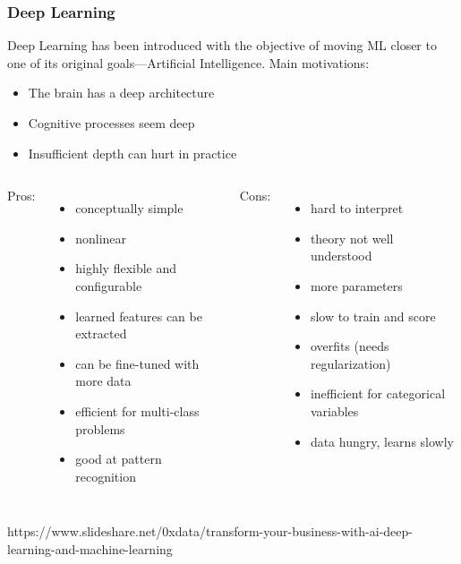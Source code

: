 \begin{frame}
  \MyLogo
  \frametitle{Deep Learning}  

\small

\begin{mdframed}[style=mystyle2]
Deep Learning has been introduced with the objective of moving ML closer to one of its original goals---\alert{Artificial Intelligence}. Main motivations:
%
\begin{itemize}\scriptsize\setlength\itemsep{0.1em}
\item The brain has a deep architecture
\item Cognitive processes seem deep
\item Insufficient depth can hurt in practice
\end{itemize}
\end{mdframed}

\medskip

\begin{columns}

{\color{blue}Pros:}
\begin{itemize}\setlength\itemsep{0.15em}
\item conceptually simple
\item nonlinear 
\item highly flexible and configurable
\item learned features can be extracted
\item can be fine-tuned with more data
\item efficient for multi-class problems
\item good at pattern recognition
\end{itemize}

{\color{red}Cons:}
\begin{itemize}\setlength\itemsep{0.15em}
\item hard to interpret 
\item theory not well understood
\item more parameters
\item slow to train and score
\item overfits (needs regularization)
\item inefficient for categorical variables
\item data hungry, learns slowly 
\end{itemize}
\end{columns}

\begin{center}
{\color{red} \scriptsize
https://www.slideshare.net/0xdata/transform-your-business-with-ai-deep-learning-and-machine-learning}
\end{center}

\end{frame}

